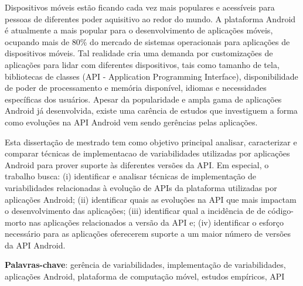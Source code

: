 \begin{resumo}

Dispositivos móveis estão ficando cada vez mais populares e acessíveis
para pessoas de diferentes poder aquisitivo ao redor do mundo. A
plataforma Android é atualmente a mais popular para o desenvolvimento
de aplicações móveis, ocupando mais de 80\% do mercado de sistemas
operacionais para aplicações de dispositivos móveis. Tal realidade
cria uma demanda por customizações de aplicações para lidar com
diferentes dispositivos, tais como tamanho de tela, bibliotecas de
classes (API - Application Programming Interface), disponibilidade de
poder de processamento e memória disponível, idiomas e necessidades
específicas dos usuários. Apesar da popularidade e ampla gama de
aplicações Android já desenvolvida, existe uma carência de estudos que
investiguem a forma como evoluções na API Android vem
sendo gerências pelas aplicações.

Esta dissertação de mestrado tem como objetivo principal analisar,
caracterizar e comparar técnicas de implementacao de variabilidades
utilizadas por aplicações Android para prover suporte às diferentes
versões da API. Em especial, o trabalho busca: (i)
identificar e analisar técnicas de implementação de variabilidades
relacionadas à evolução de APIs da plataforma utilizadas por
aplicações Android; (ii) identificar quais as evoluções na API que mais
impactam o desenvolvimento das aplicações; (iii) identificar qual a incidência de
de código-morto nas aplicações relacionados a versão da API e; (iv) identificar o
esforço necessário para as aplicações oferecerem suporte a um maior número de versões
da API Android.

\textbf{Palavras-chave}: gerência de variabilidades, implementação de variabilidades,
aplicações Android, plataforma de computação móvel, estudos empíricos, API
\end{resumo}
